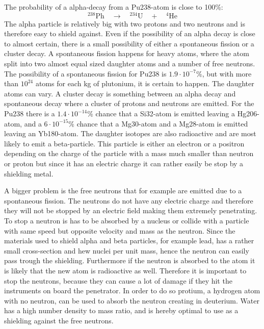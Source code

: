 The probability of a alpha-decay from a Pu238-atom is close to 100\%: 
\begin{equation}
^{238}\text{Ph} \quad \rightarrow \quad ^{234}\text{U} \quad + \quad ^4 \text{He}
\end{equation}
The alpha particle is relatively big with two protons and two neutrons and is therefore easy to shield against. Even if the possibility of an alpha decay is close to almost certain, there is a small possibility of either a spontaneous fission or a cluster decay. A spontaneous fission happens for heavy atoms, where the atom split into two almost equal sized daughter atoms and a number of free neutrons. The possibility of a spontaneous fission for Pu238 is $1.9 \cdot 10^{-7}\%$, but with more than $10^{24}$ atoms for each kg of plutonium, it is certain to happen. The daughter atoms can vary. A cluster decay is something between an alpha decay and spontaneous decay where a cluster of protons and neutrons are emitted. For the Pu238 there is a $1.4 \cdot 10^{-14}\%$ chance that a Si32-atom is emitted leaving a Hg206-atom, and a $6 \cdot 10^{-15}\%$ chance that a Mg30-atom and a Mg28-atom is emitted leaving an Yb180-atom. The daughter isotopes are also radioactive and are most likely to emit a beta-particle. This particle is either an electron or a positron depending on the charge of the particle with a mass much smaller than neutron or proton but since it has an electric charge it can rather easily be stop by a shielding metal. 

A bigger problem is the free neutrons that for example are emitted due to a spontaneous fission.  The neutrons do not have any electric charge and therefore they will not be stopped by an electric field making them extremely penetrating. To stop a neutron is has to be absorbed by a nucleus or collide with a particle with same speed but opposite velocity and mass as the neutron. Since the materials used to shield alpha and beta particles, for example lead, has a rather small cross-section and hew nuclei per unit mass, hence the neutron can easily pass trough the shielding. Furthermore if the neutron is absorbed to the atom it is likely that the new atom is radioactive as well. Therefore it is important to stop the neutrons, because they can cause a lot of damage if they hit the instruments on board the penetrator. In order to do so protium, a hydrogen atom with no neutron, can be used to absorb the neutron creating in deuterium. Water has a high number density to mass ratio, and is hereby optimal to use as a shielding against the free neutrons. 


